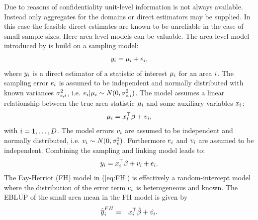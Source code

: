 \documentclass[article]{ajs}
\begin{document}
Due to reasons of confidentiality unit-level information is not always available. Instead only aggregates for the domains or direct estimators may be supplied. In this case the feasible direct estimates are known to be unreliable in the case of small sample sizes. Here area-level models can be valuable. The area-level model introduced by \cite{fay79} is build on a sampling model:
%
\[y_{i} = \mu_{i} + e_{i},\]
%
where $y_{i}$ is a direct estimator of a statistic of interest $\mu_{i}$ for an area $i$. The sampling error $e_{i}$ is assumed to be independent and normally distributed with known variances $\sigma_{e, i}^2$, i.e. $e_{i}|\mu_{i} \sim \mathit{N}(0, \sigma_{e, i}^2)$. The model assumes a linear relationship between the true area statistic $\mu_{i}$ and some auxiliary variables $x_{i}$:
%
\[\mu_{i} = x_{i}^\top \beta + v_{i},\] 
%
with $i=1,\dots, D$. 
The model errors $v_{i}$ are assumed to be independent and normally distributed, i.e. $v_{i} \sim \mathit{N}(0, \sigma_v^2)$. Furthermore $e_{i}$ and $v_{i}$ are assumed to be independent. Combining the sampling and linking model leads to:
\begin{equation}
\label{eq:FH}
y_{i} = x_{i}^\top \beta + v_{i} + e_{i}.
\end{equation} 
%
The Fay-Herriot (FH) model in (\ref{eq:FH}) is effectively a random-intercept model where the distribution of the error term $e_{i}$ is heterogeneous and known. The EBLUP of the small area mean in the FH model is given by 
\begin{eqnarray}\label{FHEBLUP}\hat{\overline{y}}_i^{FH}&=&x_{i}^\top \hat{\beta} + \hat{v_{i}}.
\end{eqnarray}
\end{document}
